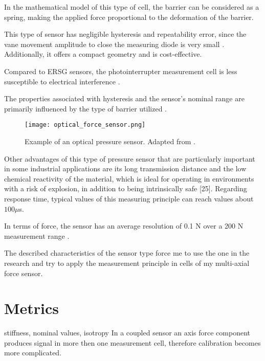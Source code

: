 In the mathematical model of this type of cell, the barrier can be considered as a spring, making the applied force proportional to the deformation of the barrier.

This type of sensor has negligible hysteresis and repeatability error, since the vane movement amplitude to close the measuring diode is very small \cite*{pressure_sens_calibration_stat_dyn}.
Additionally, it offers a compact geometry and is cost-effective. %

Compared to ERSG sensors, the photointerrupter measurement cell is less susceptible to electrical interference \cite*{my_love_pressure_photosensor}. 

The properties associated with hysteresis and the sensor's nominal range are primarily influenced by the type of barrier utilized \cite{my_love_pressure_photosensor}.
\begin{figure}[t]
\centering
\texttt{[image: optical\_force\_sensor.png]}
\caption{Example of an optical pressure sensor. Adapted from \cite[Fig. 5]{pressure_sens_calibration_stat_dyn}.}
\label{fig:optical_sensor_arrangement}

\end{figure}

Other advantages of this type of pressure sensor that are particularly important in some industrial applications are its long transmission distance and the low chemical reactivity of the material, which is ideal
for operating in environments with a risk of explosion, in addition to being intrinsically safe [25]. Regarding response time, typical values of this measuring principle can reach values about $100 \mu$s. \cite{pressure_sens_calibration_stat_dyn}

In terms of force, the sensor has an average resolution of 0.1 N over a 200 N measurement range \cite*{OPTIC_CELL_FOR_HAND}.

The described characteristics of the sensor type force me to use the one in the research and try to apply the measurement principle in cells of my multi-axial force sensor.

\section{Metrics}
stiffness, nominal values, isotropy
In a coupled sensor an axis force component produces signal in more then one measurement cell, therefore calibration becomes more complicated.
